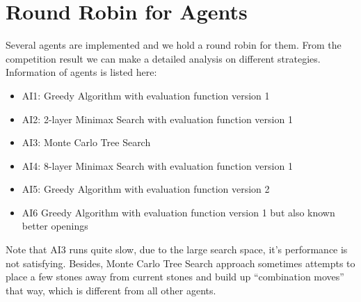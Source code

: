 \documentclass[12pt,a4paper]{article}
\begin{document}
\section{Round Robin for Agents}
Several agents are implemented and we hold a round robin for them. From the competition result we can make a detailed analysis on different strategies.\\
Information of agents is listed here:
\begin{itemize}
\item AI1: Greedy Algorithm with evaluation function version 1
\item AI2: 2-layer Minimax Search with evaluation function version 1
\item AI3: Monte Carlo Tree Search
\item AI4: 8-layer Minimax Search with evaluation function version 1
\item AI5: Greedy Algorithm with evaluation function version 2
\item AI6 Greedy Algorithm with evaluation function version 1 but also known better openings
\end{itemize}
Note that AI3 runs quite slow, due to the large search space, it's performance is not satisfying. Besides, Monte Carlo Tree Search approach sometimes attempts to place a few stones away from current stones and build up ``combination moves'' that way, which is different from all other agents.
\end{document}
